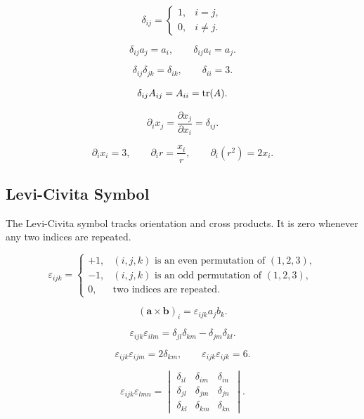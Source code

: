 \documentclass{otscience}
\begin{document}
\begin{formulabox}
    \[
        \delta_{ij}=\begin{cases}
            1, & i=j,     \\
            0, & i\neq j.
        \end{cases}
    \]

    \[
        \delta_{ij}a_j=a_i,
        \qquad
        \delta_{ij}a_i=a_j.
    \]

    \[
        \delta_{ij}\delta_{jk}=\delta_{ik},
        \qquad
        \delta_{ii}=3.
    \]

    \[
        \delta_{ij}A_{ij}=A_{ii}=\operatorname{tr}(A).
    \]

    \[
        \partial_i x_j=\frac{\partial x_j}{\partial x_i}=\delta_{ij}.
    \]

    \[
        \partial_i x_i=3,
        \qquad
        \partial_i r=\frac{x_i}{r},
        \qquad
        \partial_i(r^2)=2x_i.
    \]
\end{formulabox}

\subsection{Levi-Civita Symbol}

The Levi-Civita symbol tracks orientation and cross products. It is zero whenever any two indices are repeated.

\begin{formulabox}
    \[
        \varepsilon_{ijk}=\begin{cases}
            +1, & (i,j,k)\text{ is an even permutation of }(1,2,3), \\
            -1, & (i,j,k)\text{ is an odd permutation of }(1,2,3),  \\
            0,  & \text{two indices are repeated}.
        \end{cases}
    \]

    \[
        {(\mathbf{a}\times\mathbf{b})}_i=\varepsilon_{ijk}a_{j}b_k.
    \]

    \[
        \varepsilon_{ijk}\varepsilon_{ilm}=\delta_{jl}\delta_{km}-\delta_{jm}\delta_{kl}.
    \]

    \[
        \varepsilon_{ijk}\varepsilon_{ijm}=2\delta_{km},
        \qquad
        \varepsilon_{ijk}\varepsilon_{ijk}=6.
    \]

    \[
        \varepsilon_{ijk}\varepsilon_{lmn}=\begin{vmatrix}
            \delta_{il} & \delta_{im} & \delta_{in} \\
            \delta_{jl} & \delta_{jm} & \delta_{jn} \\
            \delta_{kl} & \delta_{km} & \delta_{kn}
        \end{vmatrix}.
    \]
\end{formulabox}
\end{document}
